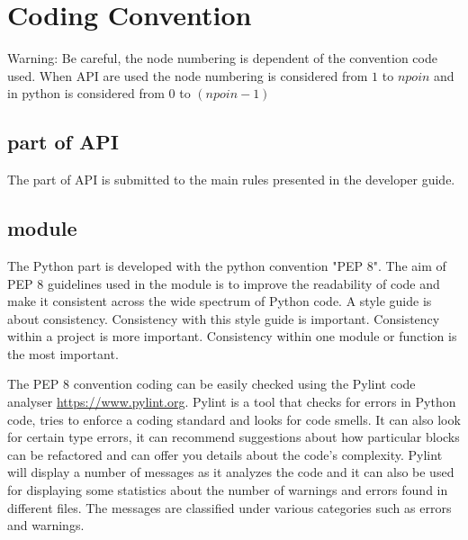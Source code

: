 %
\section{Coding Convention}
%
\begin{WarningBlock}{Warning:}
\centering
Be careful, the node numbering is dependent of the convention code used.
When \fortran API are used the node numbering is considered from
$1$ to $npoin$ and in python is considered from $0$ to $(npoin-1)$
\end{WarningBlock}

\subsection{\fortran part of API}

The \fortran part of \telemacsystem API is submitted to the main rules presented
in the developer guide.

\subsection{\TelApy{} module}

The Python part is developed with the python convention "PEP 8". The aim of
PEP 8 guidelines used in the \TelApy{} module is to improve the readability of
code and make it consistent across the wide spectrum of Python code. A style
guide is about consistency. Consistency with this style guide is important.
Consistency within a project is more important. Consistency within one module
or function is the most important.

The PEP 8 convention coding can be easily checked using the Pylint code
analyser \url{https://www.pylint.org}. Pylint is a tool that checks for
errors in Python code, tries to enforce a coding standard and looks for code
smells. It can also look for certain type errors, it can recommend suggestions
about how particular blocks can be refactored and can offer you details about
the code’s complexity. Pylint will display a number of messages as it analyzes
the code and it can also be used for displaying some statistics about the
number of warnings and errors found in different files. The messages are
classified under various categories such as errors and warnings.

%
